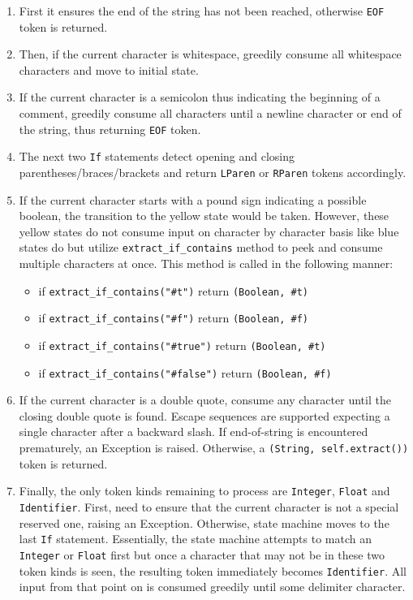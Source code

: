 \begin{itemize}
\begin{enumerate}
\item First it ensures the end of the string has not been reached, otherwise \texttt{EOF} token is returned. 
\item Then, if the current character is whitespace, greedily consume all whitespace characters and move to initial state.
\item If the current character is a semicolon thus indicating the beginning of a comment, greedily consume all characters until a newline character or end of the string, thus returning \texttt{EOF} token. 
\item The next two \texttt{If} statements detect opening and closing parentheses/braces/brackets and return \texttt{LParen} or \texttt{RParen} tokens accordingly.
\item If the current character starts with a pound sign indicating a possible boolean, the transition to the yellow state would be taken. However, these yellow states do not consume input on character by character basis like blue states do but utilize \texttt{extract\_if\_contains} method to peek and consume multiple characters at once. This method is called in the following manner:
\begin{itemize}
\item
if \texttt{extract\_if\_contains("\#t")} return \texttt{(Boolean, \#t)}
\item
if \texttt{extract\_if\_contains("\#f")} return \texttt{(Boolean, \#f)}
\item
if \texttt{extract\_if\_contains("\#true")} return \texttt{(Boolean, \#t)}
\item
if \texttt{extract\_if\_contains("\#false")} return \texttt{(Boolean, \#f)}
\end{itemize}

\item If the current character is a double quote, consume any character until the closing double quote is found. Escape sequences are supported expecting a single character after a backward slash. If end-of-string is encountered prematurely, an Exception is raised. Otherwise, a \texttt{(String, self.extract())} token is returned.

\item Finally, the only token kinds remaining to process are \texttt{Integer}, \texttt{Float} and \texttt{Identifier}. First, need to ensure that the current character is not a special reserved one, raising an Exception. Otherwise, state machine moves to the last \texttt{If} statement. Essentially, the state machine attempts to match an \texttt{Integer} or \texttt{Float} first but once a character that may not be in these two token kinds is seen, the resulting token immediately becomes \texttt{Identifier}. All input from that point on is consumed greedily until some delimiter character.
\end{enumerate}

\end{itemize}


